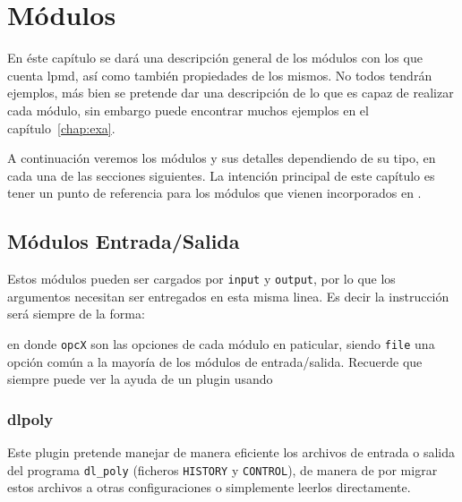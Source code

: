 \chapter{M\'odulos}
\label{chap:modulos}

En \'este cap\'itulo se dar\'a una descripci\'on general de los m\'odulos con los que cuenta lpmd, as\'i como tambi\'en propiedades de los mismos. No todos tendr\'an ejemplos, m\'as bien se pretende dar una descripci\'on de lo que es capaz de realizar cada m\'odulo, sin embargo puede encontrar muchos ejemplos en el cap\'itulo~\ref{chap:exa}.

A continuaci\'on veremos los m\'odulos y sus detalles dependiendo de su tipo, en cada una de las secciones siguientes. La intenci\'on principal de este cap\'itulo es tener un punto de referencia para los m\'odulos que vienen incorporados en {\lpmd}.

\section{M\'odulos Entrada/Salida}
\label{chap:modulos:entradasalida}
Estos m\'odulos pueden ser cargados por \verb|input| y \verb|output|, por lo que los argumentos necesitan ser entregados en esta misma linea. Es decir la instrucci\'on ser\'a siempre de la forma:


en donde \verb|opcX| son las opciones de cada m\'odulo en paticular, siendo \verb|file| una opci\'on com\'un a la mayor\'ia de los m\'odulos de entrada/salida. Recuerde que siempre puede ver la ayuda de un plugin usando


\subsection{dlpoly}
Este plugin pretende manejar de manera eficiente los archivos de entrada o salida del programa \verb|dl_poly| (ficheros \verb|HISTORY| y \verb|CONTROL|), de manera de por migrar estos archivos a otras configuraciones o simplemente leerlos directamente.

